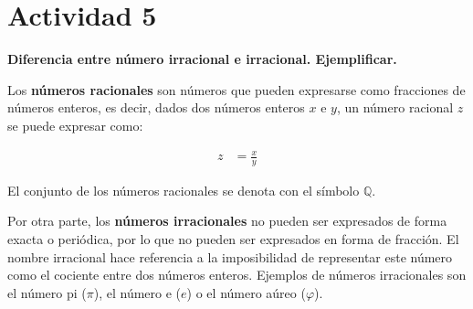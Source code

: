 \section*{Actividad 5}
\textbf{Diferencia entre número irracional e irracional. Ejemplificar.}

Los \textbf{números racionales} son números que pueden expresarse como fracciones de números enteros, es decir, dados dos números enteros $x$ e $y$, un número racional $z$ se puede expresar como:

\begin{align*}
	z &= \frac{x}{y}
\end{align*}

El conjunto de los números racionales se denota con el símbolo $\mathbb{Q}$.

Por otra parte, los \textbf{números irracionales} no pueden ser expresados de forma exacta o periódica, por lo que no pueden ser expresados en forma de fracción. El nombre irracional hace referencia a la imposibilidad de representar este número como el cociente entre dos números enteros. Ejemplos de números irracionales son el número pi ($\pi$), el número e ($e$) o el número aúreo ($\varphi$).

